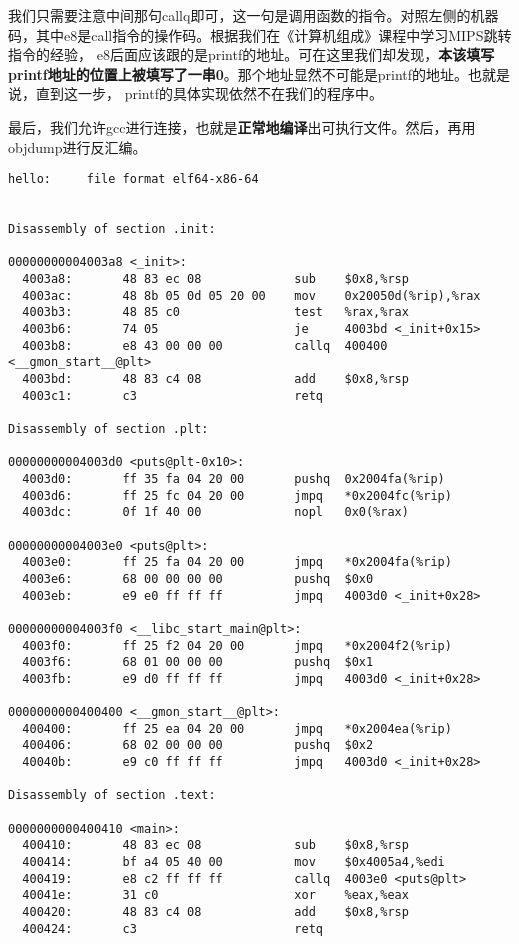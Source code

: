 我们只需要注意中间那句callq即可，这一句是调用函数的指令。对照左侧的机器码，其中e8是call指令的操作码。根据我们在《计算机组成》课程中学习MIPS跳转指令的经验，
e8后面应该跟的是printf的地址。可在这里我们却发现，\textbf{本该填写printf地址的位置上被填写了一串0}。那个地址显然不可能是printf的地址。也就是说，直到这一步，
printf的具体实现依然不在我们的程序中。

最后，我们允许gcc进行连接，也就是\textbf{正常地编译}出可执行文件。然后，再用objdump进行反汇编。

\begin{verbatim}
hello:     file format elf64-x86-64


Disassembly of section .init:

00000000004003a8 <_init>:
  4003a8:       48 83 ec 08             sub    $0x8,%rsp
  4003ac:       48 8b 05 0d 05 20 00    mov    0x20050d(%rip),%rax
  4003b3:       48 85 c0                test   %rax,%rax
  4003b6:       74 05                   je     4003bd <_init+0x15>
  4003b8:       e8 43 00 00 00          callq  400400 <__gmon_start__@plt>
  4003bd:       48 83 c4 08             add    $0x8,%rsp
  4003c1:       c3                      retq   

Disassembly of section .plt:

00000000004003d0 <puts@plt-0x10>:
  4003d0:       ff 35 fa 04 20 00       pushq  0x2004fa(%rip)
  4003d6:       ff 25 fc 04 20 00       jmpq   *0x2004fc(%rip)
  4003dc:       0f 1f 40 00             nopl   0x0(%rax)

00000000004003e0 <puts@plt>:
  4003e0:       ff 25 fa 04 20 00       jmpq   *0x2004fa(%rip)
  4003e6:       68 00 00 00 00          pushq  $0x0
  4003eb:       e9 e0 ff ff ff          jmpq   4003d0 <_init+0x28>

00000000004003f0 <__libc_start_main@plt>:
  4003f0:       ff 25 f2 04 20 00       jmpq   *0x2004f2(%rip)
  4003f6:       68 01 00 00 00          pushq  $0x1
  4003fb:       e9 d0 ff ff ff          jmpq   4003d0 <_init+0x28>

0000000000400400 <__gmon_start__@plt>:
  400400:       ff 25 ea 04 20 00       jmpq   *0x2004ea(%rip)
  400406:       68 02 00 00 00          pushq  $0x2
  40040b:       e9 c0 ff ff ff          jmpq   4003d0 <_init+0x28>

Disassembly of section .text:

0000000000400410 <main>:
  400410:       48 83 ec 08             sub    $0x8,%rsp
  400414:       bf a4 05 40 00          mov    $0x4005a4,%edi
  400419:       e8 c2 ff ff ff          callq  4003e0 <puts@plt>
  40041e:       31 c0                   xor    %eax,%eax
  400420:       48 83 c4 08             add    $0x8,%rsp
  400424:       c3                      retq   


\end{verbatim}
